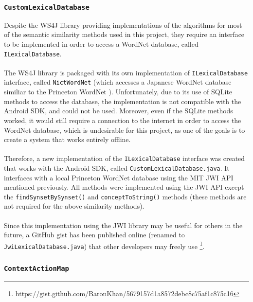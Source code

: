 \documentclass[11pt]{article}
\begin{document}
\subsubsection{\texttt{CustomLexicalDatabase}}
\label{custom-lexical-database-impl}

Despite the WS4J library providing implementations of the algorithms for most of the semantic similarity methods used in this project, they require an interface to be implemented in order to access a WordNet database, called \texttt{ILexicalDatabase}.
\\
\\
The WS4J library is packaged with its own implementation of \texttt{ILexicalDatabase} interface, called \texttt{NictWordNet} (which accesses a Japanese WordNet database similiar to the Princeton WordNet \cite{RefWorks:122}). Unfortunately, due to its use of SQLite methods to access the database, the implementation is not compatible with the Android SDK, and could not be used. Moreover, even if the SQLite methods worked, it would still require a connection to the internet in order to access the WordNet database, which is undesirable for this project, as one of the goals is to create a system that works entirely offline.
\\
\\
Therefore, a new implementation of the \texttt{ILexicalDatabase} interface was created that works with the Android SDK, called \texttt{CustomLexicalDatabase.java}. It interfaces with a local Princeton WordNet database using the MIT JWI API mentioned previously. All methods were implemented using the JWI API except the \texttt{findSynsetBySynset()} and \texttt{conceptToString()} methods (these methods are not required for the above similarity methods).
\\
\\
Since this implementation using the JWI library may be useful for others in the future, a GitHub gist has been published online (renamed to \texttt{JwiLexicalDatabase.java}) that other developers may freely use \footnote{https://gist.github.com/BaronKhan/5679157d1a8572debc8c75af1c875c16}.

\subsubsection{\texttt{ContextActionMap}}
\label{section:context-action-map}
\end{document}
